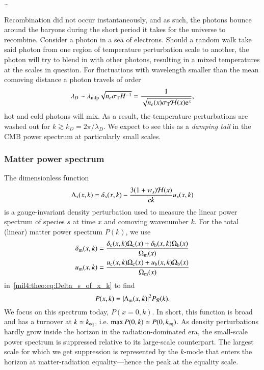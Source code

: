      \dots
    
    Recombination did not occur instantaneously, and as such, the photons bounce around the baryons during the short period it takes for the universe to recombine. Consider a photon in a sea of electrons. Should a random walk take said photon from one region of temperature perturbation scale to another, the photon will try to blend in with other photons, resulting in a mixed temperatures at the scales in question. For fluctuations with wavelength smaller than the mean comoving distance a photon travels of order
    \begin{equation}
        \lambda_D \sim \lambda\ped{mfp}\sqrt{n_e\sigma\ped{T}H^{-1}} = \frac{1}{\sqrt{n_e(x)\sigma\ped{T}\Hp(x) \eu[x]}},
    \end{equation}
    hot and cold photons will mix. As a result, the temperature perturbations are washed out for $k\gtrsim  k_D = 2\pi/\lambda_D$. We expect to see this as a \textit{damping tail} in the CMB power spectrum at particularly small scales.


    

    



\subsubsection{Matter power spectrum}
    The dimensionless function
    \begin{equation}\label{mil4:theo:eq:Delta_s_of_x_k}
        \Delta_s (x,k) = \delta_s(x,k) - \frac{3(1+w_s)\Hp(x)}{ck}u_s(x,k)
    \end{equation}
    is a gauge-invariant density perturbation used to measure the linear power spectrum of species $s$ at time $x$ and comoving wavenumber $k$. For the total (linear) matter power spectrum $P(k)$, we use
    \begin{equation}
    \begin{split}
        \delta\ped{m}(x,k) &= \frac{\delta\ped{c}(x,k) \Omega\ped{c}(x) + \delta\ped{b}(x,k) \Omega\ped{b}(x)}{\OmgM[](x)} \\
        u\ped{m}(x,k) &= \frac{u\ped{c}(x,k) \Omega\ped{c}(x) + u\ped{b}(x,k) \Omega\ped{b}(x)}{\OmgM[](x)}
    \end{split}
    \end{equation}
    in~\cref{mil4:theo:eq:Delta_s_of_x_k} to find
    \begin{equation}\label{mil4:theo:eq:matter_power_spectrum}
        P(x,k) = \abs{\Delta\ped{m}(x,k)}^2 P_\mathcal{R}(k).
    \end{equation}
    We focus on this spectrum today, $P(x\!=\!0,k)$. In short, this function is broad and has a turnover at $k\simeq k\ped{eq}$, i.e. $\max{P(0,k)} \simeq P(0,k\ped{eq})$. As density perturbations hardly grow inside the horizon in the radiation-dominated era, the small-scale power spectrum is suppressed relative to its large-scale counterpart. The largest scale for which we get suppression is represented by the $k$-mode that enters the horizon at matter-radiation equality---hence the peak at the equality scale.

